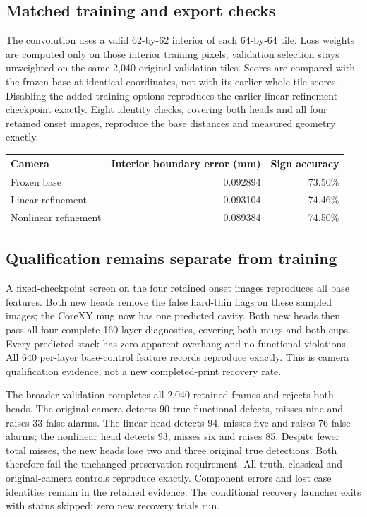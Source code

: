 \documentclass[10pt,letterpaper]{article}
\begin{document}
\subsection*{Matched training and export checks}
The convolution uses a valid 62-by-62 interior of each 64-by-64 tile. Loss weights
are computed only on those interior training pixels; validation selection stays
unweighted on the same 2,040 original validation tiles. Scores are compared with
the frozen base at identical coordinates, not with its earlier whole-tile scores.
Disabling the added training options reproduces the earlier linear refinement
checkpoint exactly. Eight identity checks, covering both heads and all four
retained onset images, reproduce the base distances and measured geometry exactly.

\begin{center}
\begin{tabular}{lrr}
\toprule
Camera & Interior boundary error (mm) & Sign accuracy\\
\midrule
Frozen base & 0.092894 & 73.50\%\\
Linear refinement & 0.093104 & 74.46\%\\
Nonlinear refinement & 0.089384 & 74.50\%\\
\bottomrule
\end{tabular}
\end{center}

\subsection*{Qualification remains separate from training}
A fixed-checkpoint screen on the four retained onset images reproduces all base
features. Both new heads remove the false hard-thin flags on these sampled
images; the CoreXY mug now has one predicted cavity. Both new heads then pass all
four complete 160-layer diagnostics, covering both mugs and both cups. Every
predicted stack has zero apparent overhang and no functional violations. All
640 per-layer base-control feature records reproduce exactly. This is camera
qualification evidence, not a new completed-print recovery rate.

The broader validation completes all 2,040 retained frames and rejects both
heads. The original camera detects 90 true functional defects, misses nine and
raises 33 false alarms. The linear head detects 94, misses five and raises 76
false alarms; the nonlinear head detects 93, misses six and raises 85. Despite
fewer total misses, the new heads lose two and three original true detections.
Both therefore fail the unchanged preservation requirement. All truth,
classical and original-camera controls reproduce exactly. Component errors and
lost case identities remain in the retained evidence. The conditional recovery
launcher exits with status skipped: zero new recovery trials run.
\end{document}

